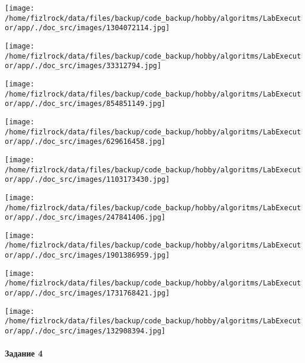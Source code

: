 \documentclass[a4paper, 12pt]{article}
\begin{document}
\texttt{[image: /home/fizlrock/data/files/backup/code\_backup/hobby/algoritms/LabExecutor/app/./doc\_src/images/1304072114.jpg]}

\texttt{[image: /home/fizlrock/data/files/backup/code\_backup/hobby/algoritms/LabExecutor/app/./doc\_src/images/33312794.jpg]}

\texttt{[image: /home/fizlrock/data/files/backup/code\_backup/hobby/algoritms/LabExecutor/app/./doc\_src/images/854851149.jpg]}

\texttt{[image: /home/fizlrock/data/files/backup/code\_backup/hobby/algoritms/LabExecutor/app/./doc\_src/images/629616458.jpg]}

\texttt{[image: /home/fizlrock/data/files/backup/code\_backup/hobby/algoritms/LabExecutor/app/./doc\_src/images/1103173430.jpg]}

\texttt{[image: /home/fizlrock/data/files/backup/code\_backup/hobby/algoritms/LabExecutor/app/./doc\_src/images/247841406.jpg]}

\texttt{[image: /home/fizlrock/data/files/backup/code\_backup/hobby/algoritms/LabExecutor/app/./doc\_src/images/1901386959.jpg]}

\texttt{[image: /home/fizlrock/data/files/backup/code\_backup/hobby/algoritms/LabExecutor/app/./doc\_src/images/1731768421.jpg]}

\texttt{[image: /home/fizlrock/data/files/backup/code\_backup/hobby/algoritms/LabExecutor/app/./doc\_src/images/132908394.jpg]}
\pagebreak
\paragraph{Задание 4}
\end{document}
